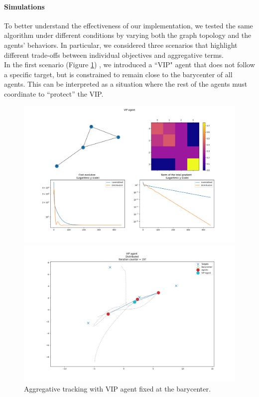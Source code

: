 \paragraph{Simulations}
To better understand the effectiveness of our implementation, we tested the same algorithm under different conditions by varying both the graph topology and the agents' behaviors. In particular, we considered three scenarios that highlight different trade-offs between individual objectives and aggregative terms. \\
In the first scenario (Figure \ref{fig:vip}) , we introduced a ``VIP" agent that does not follow a specific target, but is constrained to remain close to the barycenter of all agents. This can be interpreted as a situation where the rest of the agents must coordinate to ``protect'' the VIP. 

\newpage 
\begin{figure}[h!]
  \begin{minipage}{0.50\textwidth}
    \includegraphics[width=\linewidth]{report/figs/VIP_agent.png}
  \end{minipage}%
  \hfill
  \begin{minipage}{0.50\textwidth}
    \includegraphics[width=\linewidth]{report/figs/VIP_agent_Distributed.png}
  \end{minipage}
  \caption{Aggregative tracking with VIP agent fixed at the barycenter.}
  \label{fig:vip}
\end{figure}

